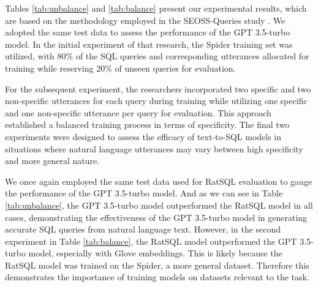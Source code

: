 

Tables \ref{tab:unbalance} and \ref{tab:balance} present our experimental results, which are based on the methodology employed in the SEOSS-Queries study \cite{TOMOVA2022108211}. We adopted the same test data to assess the performance of the GPT 3.5-turbo model. In the initial experiment of that research, the Spider training set was utilized, with 80\% of the SQL queries and corresponding utterances allocated for training while reserving 20\% of unseen queries for evaluation.

For the subsequent experiment, the researchers incorporated two specific and two non-specific utterances for each query during training while utilizing one specific and one non-specific utterance per query for evaluation. This approach established a balanced training process in terms of specificity. The final two experiments were designed to assess the efficacy of text-to-SQL models in situations where natural language utterances may vary between high specificity and more general nature.

We once again employed the same test data used for RatSQL evaluation to gauge the performance of the GPT 3.5-turbo model. And as we can see in Table \ref{tab:unbalance}, the GPT 3.5-turbo model outperformed the RatSQL model in all cases, demonstrating the effectiveness of the GPT 3.5-turbo model in generating accurate SQL queries from natural language text. However, in the second experiment in Table \ref{tab:balance}, the RatSQL model outperformed the GPT 3.5-turbo model, especially with Glove embeddings. This is likely because the RatSQL model was trained on the Spider, a more general dataset. Therefore this demonstrates the importance of training models on datasets relevant to the task.